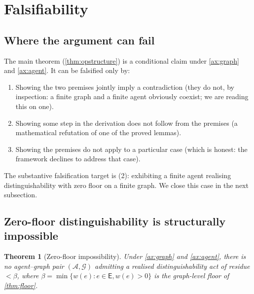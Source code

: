 \documentclass[11pt,a4paper]{article}
\theoremstyle{thmstyle}
\newtheorem{theorem}{Theorem}[section]
\theoremstyle{definition}
\theoremstyle{remark}
\newcommand{\Graph}{\mathcal{G}}
\newcommand{\Edg}{\mathsf{E}}
\newcommand{\Agent}{\mathcal{A}}
\newcommand{\floor}{\beta}
\begin{document}
\section{Falsifiability}
\label{sec:falsifiability}

\subsection{Where the argument can fail}

The main theorem (\cref{thm:opstructure}) is a conditional claim
under \cref{ax:graph} and \cref{ax:agent}. It can be falsified only
by:
\begin{enumerate}[nosep,leftmargin=*]
\item Showing the two premises jointly imply a contradiction (they
do not, by inspection: a finite graph and a finite agent obviously
coexist; we are reading this on one).
\item Showing some step in the derivation does not follow from the
premises (a mathematical refutation of one of the proved lemmas).
\item Showing the premises do not apply to a particular case (which
is honest: the framework declines to address that case).
\end{enumerate}

The substantive falsification target is (2): exhibiting a finite
agent realising distinguishability with zero floor on a finite
graph. We close this case in the next subsection.

\subsection{Zero-floor distinguishability is structurally impossible}

\begin{theorem}[Zero-floor impossibility]
\label{thm:zero_floor}
Under \cref{ax:graph} and \cref{ax:agent}, there is no agent--graph
pair $(\Agent, \Graph)$ admitting a realised distinguishability
act of residue $< \floor$, where $\floor = \min\{w(e) : e \in \Edg,
w(e) > 0\}$ is the graph-level floor of \cref{thm:floor}.
\end{theorem}
\end{document}
